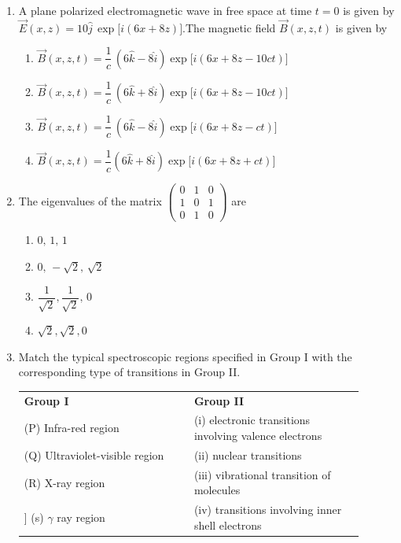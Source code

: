\documentclass[journal,12pt,onecolumn]{IEEEtran}
\theoremstyle{remark}
\begin{document}
\begin{enumerate}
\item A plane polarized electromagnetic wave in free space at time $t=0$ is given by$\vec{E}(x,z)=10\hat{j}\,\exp\bigl[i(6x+8z)\bigr].$The magnetic field $\vec{B}(x,z,t)$ is given by

\begin{enumerate}
\item $ \vec{B}(x,z,t) = \dfrac{1}{c}\,(6\hat{k}-8\hat{i})\exp\bigl[i(6x+8z-10ct)\bigr]$
\item $ \vec{B}(x,z,t) =\dfrac{1}{c}\,(6\hat{k}+8\hat{i})\exp\bigl[i(6x+8z-10ct)\bigr]$
\item $ \vec{B}(x,z,t) =\dfrac{1}{c}\,(6\hat{k}-8\hat{i})\exp\bigl[i(6x+8z-ct)\bigr]$
\item $\vec{B}(x,z,t) =\dfrac{1}{c}(6\hat{k}+8\hat{i})\exp\bigl[i(6x+8z+ct)\bigr]$
\end{enumerate}


\item The eigenvalues of the matrix
$
\begin{pmatrix}
0 & 1 & 0\\[4pt]
1 & 0 & 1\\[4pt]
0 & 1 & 0
\end{pmatrix}
$
are
\begin{multicols}{4}
\begin{enumerate}
\item $0,\,1,\,1$
\item $0,\,-\sqrt{2},\,\sqrt{2}$
\item $\dfrac{1}{\sqrt{2}},\dfrac{1}{\sqrt{2}},\,0$
\item $\sqrt{2},\sqrt{2},0$
\end{enumerate}
\end{multicols}

\item Match the typical spectroscopic regions specified in Group I with the corresponding type of transitions in Group II.
\begin{center}
\begin{tabular}{@{}p{0.45\linewidth}p{0.45\linewidth}@{}}
\textbf{Group I} & \textbf{Group II} \\[4pt]
(P) Infra-red region & (i) electronic transitions involving valence electrons \\[4pt]
(Q) Ultraviolet-visible region & (ii) nuclear transitions \\[4pt]
(R) X-ray region & (iii) vibrational transition of molecules\\[4pt]]
(s) $\gamma$ ray region & (iv) transitions involving inner shell electrons


\end{tabular}
\end{center}
\end{enumerate}
\end{document}
